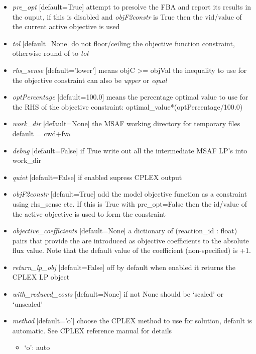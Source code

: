 \documentclass[a4paper,11pt,english]{sphinxmanual}
\begin{document}
\begin{fulllineitems}
\begin{itemize}
\item {} 
\emph{pre\_opt} {[}default=True{]} attempt to presolve the FBA and report its results in the ouput, if this is disabled and \emph{objF2constr} is True then the vid/value of the current active objective is used

\item {} 
\emph{tol}  {[}default=None{]} do not floor/ceiling the objective function constraint, otherwise round of to \emph{tol}

\item {} 
\emph{rhs\_sense} {[}default='lower'{]} means objC \textgreater{}= objVal the inequality to use for the objective constraint can also be \emph{upper} or \emph{equal}

\item {} 
\emph{optPercentage} {[}default=100.0{]} means the percentage optimal value to use for the RHS of the objective constraint: optimal\_value*(optPercentage/100.0)

\item {} 
\emph{work\_dir} {[}default=None{]} the MSAF working directory for temporary files default = cwd+fva

\item {} 
\emph{debug} {[}default=False{]} if True write out all the intermediate MSAF LP's into work\_dir

\item {} 
\emph{quiet} {[}default=False{]} if enabled supress CPLEX output

\item {} 
\emph{objF2constr} {[}default=True{]} add the model objective function as a constraint using rhs\_sense etc. If
this is True with pre\_opt=False then the id/value of the active objective is used to form the constraint

\item {} 
\emph{objective\_coefficients} {[}default=None{]} a dictionary of (reaction\_id : float) pairs that provide the are introduced as objective coefficients to the absolute flux value. Note that the default value of the coefficient (non-specified) is +1.

\item {} 
\emph{return\_lp\_obj} {[}default=False{]} off by default when enabled it returns the CPLEX LP object

\item {} 
\emph{with\_reduced\_costs} {[}default=None{]} if not None should be `scaled' or `unscaled'

\item {} 
\emph{method} {[}default='o'{]} choose the CPLEX method to use for solution, default is automatic. See CPLEX reference manual for details
\begin{itemize}
\item {} 
`o': auto


\end{itemize}
\end{itemize}
\end{fulllineitems}
\end{document}
